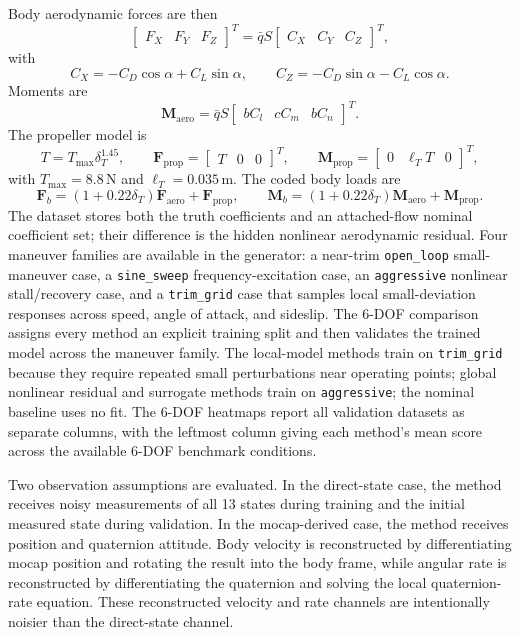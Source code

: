 \documentclass[11pt]{article}
\begin{document}
Body aerodynamic forces are then
\[
\begin{bmatrix}F_X&F_Y&F_Z\end{bmatrix}^T
= \bar{q}S\begin{bmatrix}C_X&C_Y&C_Z\end{bmatrix}^T,
\]
with
\[
C_X=-C_D\cos\alpha+C_L\sin\alpha,\qquad
C_Z=-C_D\sin\alpha-C_L\cos\alpha.
\]
Moments are
\[
\mathbf{M}_{\mathrm{aero}}=\bar{q}S
\begin{bmatrix}
bC_l & cC_m & bC_n
\end{bmatrix}^T.
\]
The propeller model is
\[
T=T_{\max}\delta_T^{1.45},\qquad
\mathbf{F}_{\mathrm{prop}}=\begin{bmatrix}T&0&0\end{bmatrix}^T,\qquad
\mathbf{M}_{\mathrm{prop}}=\begin{bmatrix}0&\ell_TT&0\end{bmatrix}^T,
\]
with $T_{\max}=8.8\,\mathrm{N}$ and $\ell_T=0.035\,\mathrm{m}$. The coded body loads are
\[
\mathbf{F}_b=(1+0.22\delta_T)\mathbf{F}_{\mathrm{aero}}+\mathbf{F}_{\mathrm{prop}},
\qquad
\mathbf{M}_b=(1+0.22\delta_T)\mathbf{M}_{\mathrm{aero}}+\mathbf{M}_{\mathrm{prop}}.
\]
The dataset stores both the truth coefficients and an attached-flow nominal coefficient set; their difference is the hidden nonlinear aerodynamic residual. Four maneuver families are available in the generator: a near-trim \texttt{open\_loop} small-maneuver case, a \texttt{sine\_sweep} frequency-excitation case, an \texttt{aggressive} nonlinear stall/recovery case, and a \texttt{trim\_grid} case that samples local small-deviation responses across speed, angle of attack, and sideslip. The 6-DOF comparison assigns every method an explicit training split and then validates the trained model across the maneuver family. The local-model methods train on \texttt{trim\_grid} because they require repeated small perturbations near operating points; global nonlinear residual and surrogate methods train on \texttt{aggressive}; the nominal baseline uses no fit. The 6-DOF heatmaps report all validation datasets as separate columns, with the leftmost column giving each method's mean score across the available 6-DOF benchmark conditions.

Two observation assumptions are evaluated. In the direct-state case, the method receives noisy measurements of all 13 states during training and the initial measured state during validation. In the mocap-derived case, the method receives position and quaternion attitude. Body velocity is reconstructed by differentiating mocap position and rotating the result into the body frame, while angular rate is reconstructed by differentiating the quaternion and solving the local quaternion-rate equation. These reconstructed velocity and rate channels are intentionally noisier than the direct-state channel.
\end{document}
